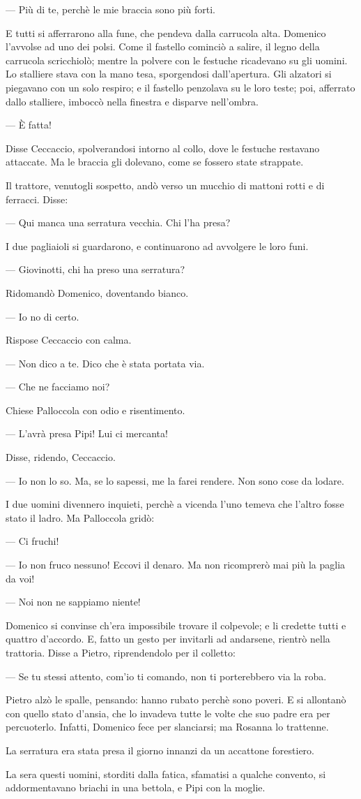 — Più di te, perchè le mie braccia sono più forti.

E tutti si afferrarono alla fune, che pendeva dalla carrucola alta. Domenico l’avvolse ad uno dei polsi. Come il fastello cominciò a salire, il legno della carrucola scricchiolò; mentre la polvere con le festuche ricadevano su gli uomini. Lo stalliere stava con la mano tesa, sporgendosi dall’apertura. Gli alzatori si piegavano con un solo respiro; e il fastello penzolava su le loro teste; poi, afferrato dallo stalliere, imboccò nella finestra e disparve nell’ombra.

— È fatta!

Disse Ceccaccio, spolverandosi intorno al collo, dove le festuche restavano attaccate. Ma le braccia gli dolevano, come se fossero state strappate.

Il trattore, venutogli sospetto, andò verso un mucchio di mattoni rotti e di ferracci. Disse:

— Qui manca una serratura vecchia. Chi l’ha presa?

I due pagliaioli si guardarono, e continuarono ad avvolgere le loro funi.

— Giovinotti, chi ha preso una serratura?

Ridomandò Domenico, doventando bianco.

— Io no di certo.

Rispose Ceccaccio con calma.

— Non dico a te. Dico che è stata portata via.

— Che ne facciamo noi?

Chiese Palloccola con odio e risentimento.

— L’avrà presa Pipi! Lui ci mercanta!

Disse, ridendo, Ceccaccio.

— Io non lo so. Ma, se lo sapessi, me la farei rendere. Non sono cose da lodare.

I due uomini divennero inquieti, perchè a vicenda l’uno temeva che l’altro fosse stato il ladro. Ma Palloccola gridò:

— Ci fruchi!

— Io non fruco nessuno! Eccovi il denaro. Ma non ricomprerò mai più la paglia da voi!

— Noi non ne sappiamo niente!

Domenico si convinse ch’era impossibile trovare il colpevole; e li credette tutti e quattro d’accordo. E, fatto un gesto per invitarli ad andarsene, rientrò nella trattoria. Disse a Pietro, riprendendolo per il colletto:

— Se tu stessi attento, com’io ti comando, non ti porterebbero via la roba.

Pietro alzò le spalle, pensando: hanno rubato perchè sono poveri. E si allontanò con quello stato d’ansia, che lo invadeva tutte le volte che suo padre era per percuoterlo. Infatti, Domenico fece per slanciarsi; ma Rosanna lo trattenne.

La serratura era stata presa il giorno innanzi da un accattone forestiero.

La sera questi uomini, storditi dalla fatica, sfamatisi a qualche convento, si addormentavano briachi in una bettola, e Pipi con la moglie.
